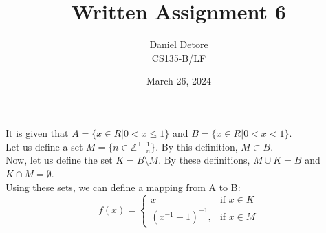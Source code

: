\documentclass{article}
\title{Written Assignment 6}
\author{Daniel Detore\\CS135-B/LF}
\date{March 26, 2024}
\begin{document}
\maketitle
\raggedright

\section{}
It is given that $A = \{x \in R | 0 < x \leq 1\}$ and $B = \{x \in R | 0 < x < 1\}.$\\
Let us define a set $M = \{ n \in \mathbb{Z}^+ | \frac{1}{n} \}$. By this definition, $M \subset B$. \\
Now, let us define the set $K = B \setminus M$. By these definitions, $M \cup K = B$ and $K \cap M = \emptyset$. \\
Using these sets, we can define a mapping from A to B:
\begin{equation*}
    f(x) = \begin{cases}
        x & \text{if } x \in K\\
        (x^{-1} + 1)^{-1},& \text{if } x \in M
    \end{cases}
\end{equation*}
\end{document}
